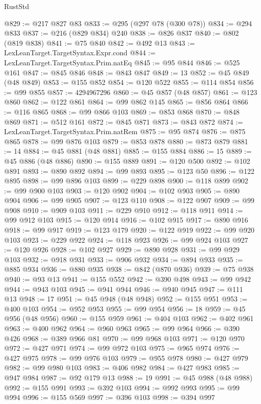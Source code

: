 \begin{lexlean}{RustStd}
\begin{coremodule}
{\begin{coremodule}
{{{{{{{{{{{{{{{{{{{{{{{{{{{{{{{{{@829 := @217 @827 @83
@833 := @295 (@297 @78 (@300 @78))
@834 := @294 @833
@837 := @216 (@829 @834) @240
@838 := @826 @837
@840 := @802 (@819 @838)
@841 := @75 @840
@842 := @492 @13
@843 := LexLeanTarget.TargetSyntax.Expr.cond
@844 := LexLeanTarget.TargetSyntax.Prim.natEq
@845 := @95 @844
@846 := @525 @161
@847 := @845 @846
@848 := @843 @847
@849 := 13
@852 := @45 @849 (@48 @849)
@853 := @155 @852
@854 := @120 @522
@855 := @114 @854
@856 := @99 @855
@857 := 4294967296
@860 := @45 @857 (@48 @857)
@861 := @123 @860
@862 := @122 @861
@864 := @99 @862 @145
@865 := @856 @864
@866 := @116 @865
@868 := @99 @866 @103
@869 := @853 @868
@870 := @848 @869
@871 := @512 @161
@872 := @845 @871
@873 := @843 @872
@874 := LexLeanTarget.TargetSyntax.Prim.natRem
@875 := @95 @874
@876 := @875 @865
@878 := @99 @876 @103
@879 := @853 @878
@880 := @873 @879
@881 := 14
@884 := @45 @881 (@48 @881)
@885 := @155 @884
@886 := 15
@889 := @45 @886 (@48 @886)
@890 := @155 @889
@891 := @120 @500
@892 := @102 @891
@893 := @890 @892
@894 := @99 @893
@895 := @123 @50
@896 := @122 @895
@898 := @99 @896 @103
@899 := @229 @898
@900 := @118 @899
@902 := @99 @900 @103
@903 := @120 @902
@904 := @102 @903
@905 := @890 @904
@906 := @99 @905
@907 := @123 @110
@908 := @122 @907
@909 := @99 @908
@910 := @909 @103
@911 := @229 @910
@912 := @118 @911
@914 := @99 @912 @103
@915 := @120 @914
@916 := @102 @915
@917 := @890 @916
@918 := @99 @917
@919 := @123 @179
@920 := @122 @919
@922 := @99 @920 @103
@923 := @229 @922
@924 := @118 @923
@926 := @99 @924 @103
@927 := @120 @926
@928 := @102 @927
@929 := @890 @928
@931 := @99 @929 @103
@932 := @918 @931
@933 := @906 @932
@934 := @894 @933
@935 := @885 @934
@936 := @880 @935
@938 := @842 (@870 @936)
@939 := @75 @938
@940 := @93 @13
@941 := @155 @552
@942 := @390 @498
@943 := @99 @942
@944 := @943 @103
@945 := @941 @944
@946 := @940 @945
@947 := @111 @13
@948 := 17
@951 := @45 @948 (@48 @948)
@952 := @155 @951
@953 := @400 @103
@954 := @952 @953
@955 := @99 @954
@956 := 18
@959 := @45 @956 (@48 @956)
@960 := @155 @959
@961 := @404 @103
@962 := @402 @961
@963 := @400 @962
@964 := @960 @963
@965 := @99 @964
@966 := @390 @426
@968 := @389 @966 @81
@970 := @99 @968 @103
@971 := @120 @970
@972 := @427 @971
@974 := @99 @972 @103
@975 := @965 @974
@976 := @427 @975
@978 := @99 @976 @103
@979 := @955 @978
@980 := @427 @979
@982 := @99 @980 @103
@983 := @406 @982
@984 := @427 @983
@985 := @947 @984
@987 := @92 @179 @13
@988 := 19
@991 := @45 @988 (@48 @988)
@992 := @155 @991
@993 := @392 @103
@994 := @992 @993
@995 := @99 @994
@996 := @155 @569
@997 := @396 @103
@998 := @394 @997
}}}}}}}}}}}}}}}}}}}}}}}}}}}}}}}}}
\end{coremodule}}
\end{coremodule}
\end{lexlean}

